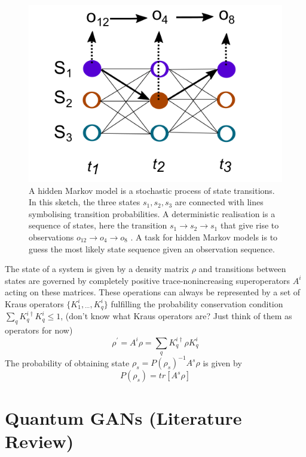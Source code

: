 \documentclass[conference]{IEEEtran}
\begin{document}
\begin{figure}[htbp]
\centerline{\includegraphics[scale = 0.3]{Images/markov.png}}
\caption{A hidden Markov model
is a stochastic process of state transitions. In this
sketch, the three states $s_1 , s_2 , s_3$ are connected with
lines symbolising transition probabilities. A deterministic realisation is a sequence of states, here the
transition $s_1 \to s_2 \to s_1$ that give rise to observations $o_{12} \to o_4  \to o_8$ . A task for hidden Markov models
is to guess the most likely state sequence given an observation sequence.}
\label{markov}
\end{figure}

The state of a system is given by a density matrix $\rho$ and transitions between
states are governed by completely positive trace-nonincreasing superoperators $A^i$ acting on these matrices.
These operations can always be represented by a set of Kraus operators $\{K_{1}^{i}, {}_{\cdots}, K_{q}^{i}\}$
fulfilling the probability conservation condition $\sum_{q} K_{q}^{i\dag}K_{q}^{i} \leq 1$, (don't know what Kraus operators are? Just think of them as operators for now)
\begin{equation*}
    \rho^{'} = A^{i}\rho = \sum_{q} K_{q}^{i\dag}\rho K_{q}^{i}
\end{equation*}
The probability of obtaining state $\rho_s = P(\rho_s)^{-1}A^{s}\rho$ is given by
\begin{equation*}
    P(\rho_s) = tr[A^{s}\rho]
\end{equation*}

\section{Quantum GANs (Literature Review)}
\end{document}
